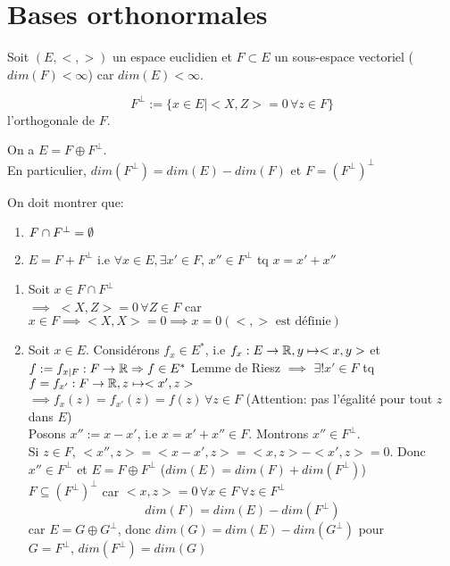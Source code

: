 \section{Bases orthonormales}
Soit $(E, <,>)$ un espace euclidien et  $F \subset E$ un sous-espace vectoriel ($dim(F) < \infty$) car $dim(E) < \infty$.
\begin{note}
    \[
        F^{\perp} := \{x \in E \mid <X, Z> = 0 \, \forall z \in F\} 
    \] 
    l'orthogonale de $F$.
\end{note}
\begin{theorem}
    On a $E = F \oplus F^{\perp}$.\\
    En particulier,  $dim(F^{\perp}) = dim(E) - dim(F)$ et  $F = (F^{\perp})^{\perp}$
\end{theorem}
\begin{preuve}
   On doit montrer que:
   \begin{enumerate}
       \item $F \cap F^{\perp} = \emptyset$
       \item $E = F + F^{\perp}$ i.e  $\forall x \in E, \exists x' \in F, \, x'' \in F^{\perp}$ tq $x = x' + x''$ 
   \end{enumerate}
   \begin{enumerate}
       \item Soit $x \in F \cap F^{\perp}$\\
            $\implies$ $<X, Z> = 0 \, \forall Z \in F$ car $x \in F \implies <X, X> = 0 \implies x = 0 (<,> \text{ est définie})$ 
        \item Soit $x \in E$. Considérons  $f_x \in E^{*}$, i.e  $f_x: E \to \mathbb{R}, y \mapsto <x, y>$ et $f := f_{x|F}: F \to \mathbb{R} \Rightarrow f \in E^{*}$
            Lemme de Riesz $\implies$ $\exists! x' \in F$ tq $f = f_{x'}: F \to \mathbb{R}, z \mapsto <x', z>$\\
            $\implies f_{x}(z) = f_{x'}(z) = f(z)\, \forall z \in F$ (Attention: pas l'égalité pour tout $z$ dans  $E$)\\
            Posons $x'' := x - x'$, i.e  $x = x' + x'' \in F$. Montrons  $x'' \in  F^{\perp}$.\\
            Si $z \in F$,  $<x'', z> = <x - x', z> = <x, z> - <x', z> = 0$. Donc $x'' \in F^{\perp}$ et  $E = F \oplus F^{\perp}$ ($dim(E) = dim(F) + dim(F^{\perp})$) \\
            $F \subseteq (F^{\perp})^{\perp}$ car $<x, z> = 0 \, \forall x \in F \, \forall z \in F^{\perp}$
            \[
                dim(F) = dim(E) - dim(F^{\perp})
            \] 
            car $E = G \oplus G^{\perp}$, donc  $dim(G) = dim(E) - dim(G^{\perp})$ pour  $G = F^{\perp}, \, dim(F^{\perp}) = dim(G)$
   \end{enumerate}
\end{preuve}
